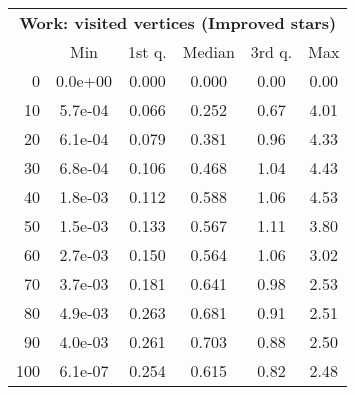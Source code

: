 \begin{tabular}{r|ccccc}
  \multicolumn{6}{c}{{\bf Work: visited vertices (Improved stars)}} \\
  & Min & 1st q. & Median & 3rd q. & Max \\ \hline\hline
  0 & 0.0e+00 & 0.000 & 0.000 & 0.00 & 0.00
\\ 10 & 5.7e-04 & 0.066 & 0.252 & 0.67 & 4.01
\\ 20 & 6.1e-04 & 0.079 & 0.381 & 0.96 & 4.33
\\ 30 & 6.8e-04 & 0.106 & 0.468 & 1.04 & 4.43
\\ 40 & 1.8e-03 & 0.112 & 0.588 & 1.06 & 4.53
\\ 50 & 1.5e-03 & 0.133 & 0.567 & 1.11 & 3.80
\\ 60 & 2.7e-03 & 0.150 & 0.564 & 1.06 & 3.02
\\ 70 & 3.7e-03 & 0.181 & 0.641 & 0.98 & 2.53
\\ 80 & 4.9e-03 & 0.263 & 0.681 & 0.91 & 2.51
\\ 90 & 4.0e-03 & 0.261 & 0.703 & 0.88 & 2.50
\\ 100 & 6.1e-07 & 0.254 & 0.615 & 0.82 & 2.48
\end{tabular}
